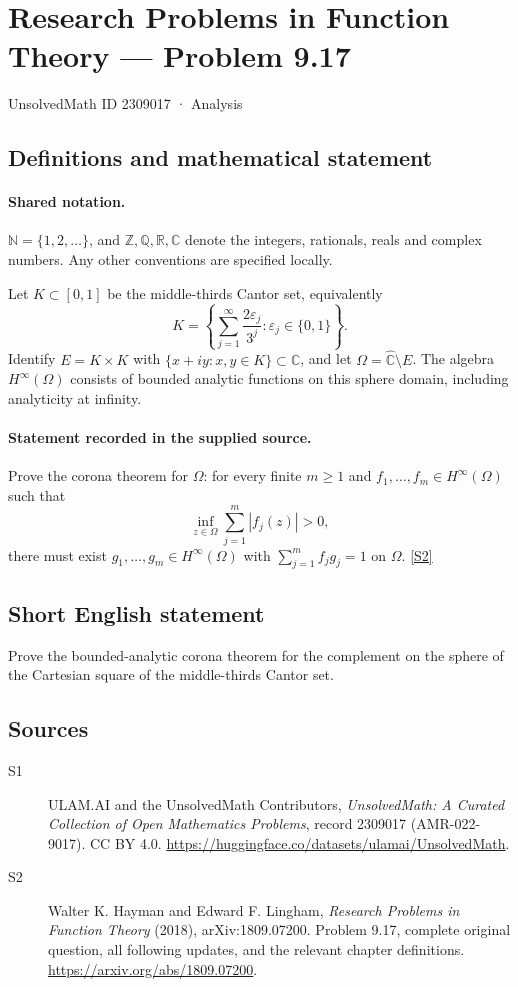 \documentclass[11pt]{book}
\newcommand{\sref}[2]{\hyperlink{source:#1:#2}{[S#2]}}
\begin{document}
\setcounter{section}{2309016}
\section{Research Problems in Function Theory — Problem 9.17}\label{2309017}
{\small\sffamily UnsolvedMath ID 2309017 · Analysis}
\subsection{Definitions and mathematical statement}

\paragraph{Shared notation.}$\mathbb N=\{1,2,\ldots\}$, and $\mathbb Z,\mathbb Q,\mathbb R,\mathbb C$ denote the integers, rationals, reals and complex numbers. Any other conventions are specified locally.


Let $K\subset[0,1]$ be the middle-thirds Cantor set, equivalently \[K=\left\{\sum_{j=1}^{\infty}\frac{2\varepsilon_j}{3^j}:\varepsilon_j\in\{0,1\}\right\}.\] Identify $E=K\times K$ with $\{x+iy:x,y\in K\}\subset\mathbb C$, and let $\Omega=\widehat{\mathbb C}\setminus E$. The algebra $H^{\infty}(\Omega)$ consists of bounded analytic functions on this sphere domain, including analyticity at infinity.
\paragraph{Statement recorded in the supplied source.}
Prove the corona theorem for $\Omega$: for every finite $m\ge1$ and $f_1,\ldots,f_m\in H^{\infty}(\Omega)$ such that \[\inf_{z\in\Omega}\sum_{j=1}^m|f_j(z)|>0,\] there must exist $g_1,\ldots,g_m\in H^{\infty}(\Omega)$ with $\sum_{j=1}^mf_jg_j=1$ on $\Omega$. \sref{2309017}{2}
\subsection{Short English statement}
Prove the bounded-analytic corona theorem for the complement on the sphere of the Cartesian square of the middle-thirds Cantor set.
\subsection{Sources}
\begin{description}
\item[\hypertarget{source:2309017:1}{S1}] ULAM.AI and the UnsolvedMath Contributors, \emph{UnsolvedMath: A Curated Collection of Open Mathematics Problems}, record 2309017 (AMR-022-9017). CC BY 4.0. \url{https://huggingface.co/datasets/ulamai/UnsolvedMath}.
\item[\hypertarget{source:2309017:2}{S2}] Walter K. Hayman and Edward F. Lingham, \emph{Research Problems in Function Theory} (2018), arXiv:1809.07200. Problem 9.17, complete original question, all following updates, and the relevant chapter definitions. \url{https://arxiv.org/abs/1809.07200}.
\end{description}
\label{end:2309017}
\end{document}
